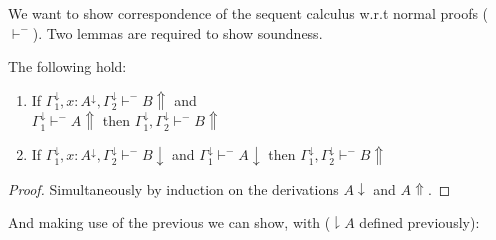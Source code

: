 We want to show correspondence of the sequent calculus  w.r.t normal proofs ($\vdash^{-}$).  Two lemmas are required to show soundness. 
\begin{lemma}
The following hold:
\begin{enumerate}
\item If $\Gamma_1^\downarrow, x:A^\downarrow,\Gamma_2^\downarrow\vdash^{-} B\Uparrow$ and\\$\Gamma_1^\downarrow\vdash^{-} A\Uparrow$ then  $\Gamma_1^\downarrow,\Gamma_2^\downarrow\vdash^{-} B\Uparrow$
\item  If $\Gamma_1^\downarrow, x:A^\downarrow,\Gamma_2^\downarrow\vdash^{-} B\downarrow$ and $\Gamma_1^\downarrow\vdash^{-} A\downarrow$ then $\Gamma_1^\downarrow,\Gamma_2^\downarrow\vdash^{-} B\Uparrow$    
\end{enumerate}
\end{lemma}
\begin{proof}
Simultaneously by induction on the derivations $A\downarrow$ and $A\Uparrow$.
\end{proof}
And making use of the previous we can show, with ($\downharpoonright A$ defined previously):
